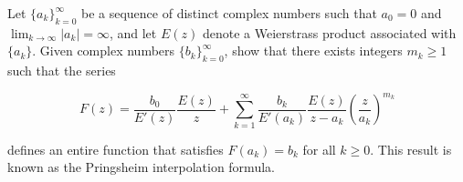 Let $\{a_k\}_{k = 0}^{\infty}$ be a sequence of distinct complex numbers such that $a_0 = 0$ and 
$\lim_{k \to \infty} |a_k| = \infty$, and let $E(z)$ denote a Weierstrass product associated with $\{a_k\}$. Given 
complex numbers $\{b_k\}_{k = 0}^{\infty}$, show that there exists integers $m_k \ge 1$ such that the series

$$
F(z) = \frac{b_0}{E'(z)} \frac{E(z)}{z} + \sum_{k=1}^{\infty} \frac{b_k}{E'(a_k)} \frac{E(z)}{z - a_k} \left(\frac{z}{a_k} \right)^{m_k}
$$

defines an entire function that satisfies $F(a_k) = b_k$ for all $k \ge 0$. This result is known as the Pringsheim 
interpolation formula.
